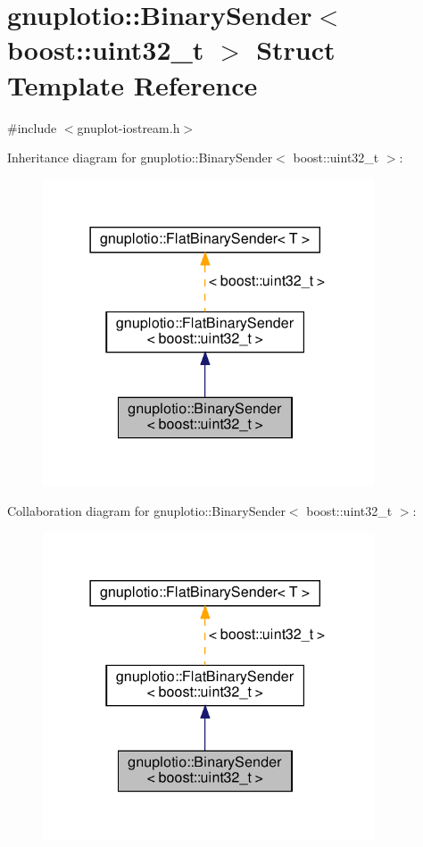 \hypertarget{structgnuplotio_1_1_binary_sender_3_01boost_1_1uint32__t_01_4}{}\section{gnuplotio\+:\+:Binary\+Sender$<$ boost\+:\+:uint32\+\_\+t $>$ Struct Template Reference}
\label{structgnuplotio_1_1_binary_sender_3_01boost_1_1uint32__t_01_4}


{\ttfamily \#include $<$gnuplot-\/iostream.\+h$>$}



Inheritance diagram for gnuplotio\+:\+:Binary\+Sender$<$ boost\+:\+:uint32\+\_\+t $>$\+:
\nopagebreak
\begin{figure}[H]
\begin{center}
\leavevmode
\includegraphics[width=278pt]{structgnuplotio_1_1_binary_sender_3_01boost_1_1uint32__t_01_4__inherit__graph}
\end{center}
\end{figure}


Collaboration diagram for gnuplotio\+:\+:Binary\+Sender$<$ boost\+:\+:uint32\+\_\+t $>$\+:
\nopagebreak
\begin{figure}[H]
\begin{center}
\leavevmode
\includegraphics[width=278pt]{structgnuplotio_1_1_binary_sender_3_01boost_1_1uint32__t_01_4__coll__graph}
\end{center}
\end{figure}
